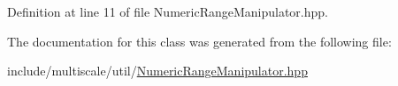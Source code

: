 Definition at line 11 of file Numeric\-Range\-Manipulator.\-hpp.



The documentation for this class was generated from the following file\-:\begin{DoxyCompactItemize}
\item 
include/multiscale/util/\hyperlink{NumericRangeManipulator_8hpp}{Numeric\-Range\-Manipulator.\-hpp}\end{DoxyCompactItemize}
